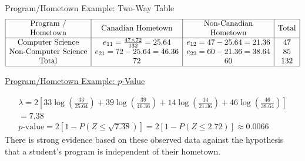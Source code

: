 \begin{Example}{Program/Hometown Example: Two-Way Table}{}
    \[ \begin{array}{|c|c|c|c|}
            \hline \begin{array}{c}
                \text{Program /} \\
                \text{Hometown}
            \end{array} & \text{Canadian Hometown}               & \begin{array}{c}
                \text{Non-Canadian} \\
                \text{Hometown}
            \end{array} & \text{Total} \\
            \hline
            \text{Computer Science}           & e_{11}=\frac{47 \times{72}}{132}=25.64 & e_{12}=47-25.64=21.36      & 47           \\
            \text{Non-Computer Science}       & e_{21}=72-25.64=46.36                  & e_{22}=60-21.36=38.64      & 85           \\
            \text{Total}                      & 72                                     & 60                         & 132          \\
            \hline
        \end{array} \]

    \underline{Program/Hometown Example: $ p $-Value}

    \[
        \begin{aligned}
            \lambda=2\left[33 \log \left(\frac{33}{25.64}\right)+39 \log \left(\frac{39}{46.36}\right)+14 \log \left(\frac{14}{21.36}\right)+46 \log \left(\frac{46}{38.64}\right)\right] \\
            =7.38                                                                                                                                                                         \\
            p \text{-value}=2[1-P(Z \leq \sqrt{7.38})]=2[1-P(Z \leq 2.72)] \approx 0.0066
        \end{aligned}
    \]
    There is strong evidence based on these observed data against the hypothesis that a student's program is independent of their hometown.
\end{Example}


